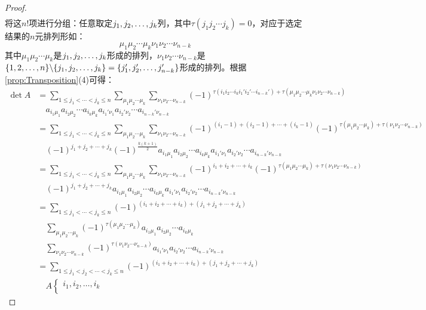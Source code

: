 \begin{proof}
\begin{align*}
	\end{align*}
	将这$n!$项进行分组：任意取定$j_1, j_2, \dots, j_{k}$列，其中$\tau(j_1j_2\cdots j_k)=0$，对应于选定结果的$n$元排列形如：
	\begin{equation*}
		\mu_1\mu_2\cdots\mu_k\nu_1\nu_2\cdots\nu_{n-k}
	\end{equation*}
	其中$\mu_1\mu_2\cdots\mu_k$是$j_1, j_2, \dots, j_{k}$形成的排列，$\nu_1\nu_2\cdots\nu_{n-k}$是$\{1,2,\dots,n\}\backslash\{j_1, j_2, \dots, j_{k}\}=\{j_1',j_2',\dots,j_{n-k}'\}$形成的排列。根据\cref{prop:Transposition}(4)可得：
	\begin{align*}
		\det A&=\sum_{1\leqslant j_1<\cdots<j_k\leqslant n}^{}\sum_{\mu_1\mu_2\cdots\mu_k}^{}\sum_{\nu_1\nu_2\cdots\nu_{n-k}}^{}(-1)^{\tau(i_1i_2\cdots i_ki_1'i_2'\cdots i_{n-k}')+\tau(\mu_1\mu_2\cdots\mu_k\nu_1\nu_2\cdots\nu_{n-k})} \\
		&\quad a_{i_1\mu_1}a_{i_2\mu_2}\cdots a_{i_k\mu_k}a_{i_1'\nu_1}a_{i_2'\nu_2}\cdots a_{i_{n-k}'\nu_{n-k}} \\
		&=\sum_{1\leqslant j_1<\cdots<j_k\leqslant n}^{}\sum_{\mu_1\mu_2\cdots\mu_k}^{}\sum_{\nu_1\nu_2\cdots\nu_{n-k}}^{}(-1)^{(i_1-1)+(i_2-1)+\cdots+(i_{k}-1)}(-1)^{\tau(\mu_1\mu_2\cdots\mu_k)+\tau(\nu_1\nu_2\cdots\nu_{n-k})} \\
		&\quad(-1)^{j_1+j_2+\cdots+j_k}(-1)^{\frac{k(k+1)}{2}}a_{i_1\mu_1}a_{i_2\mu_2}\cdots a_{i_k\mu_k}a_{i_1'\nu_1}a_{i_2'\nu_2}\cdots a_{i_{n-k}'\nu_{n-k}} \\
		&=\sum_{1\leqslant j_1<\cdots<j_k\leqslant n}^{}\sum_{\mu_1\mu_2\cdots\mu_k}^{}\sum_{\nu_1\nu_2\cdots\nu_{n-k}}^{}(-1)^{i_1+i_2+\cdots+i_k}(-1)^{\tau(\mu_1\mu_2\cdots\mu_k)+\tau(\nu_1\nu_2\cdots\nu_{n-k})} \\
		&\quad(-1)^{j_1+j_2+\cdots+j_k}a_{i_1\mu_1}a_{i_2\mu_2}\cdots a_{i_k\mu_k}a_{i_1'\nu_1}a_{i_2'\nu_2}\cdots a_{i_{n-k}'\nu_{n-k}} \\
		&=\sum_{1\leqslant j_1<\cdots<j_k\leqslant n}^{}(-1)^{(i_1+i_2+\cdots+i_k)+(j_1+j_2+\cdots+j_k)} \\
		&\quad\sum_{\mu_1\mu_2\cdots\mu_k}^{}(-1)^{\tau(\mu_1\mu_2\cdots\mu_k)}a_{i_1\mu_1}a_{i_2\mu_2}\cdots a_{i_k\mu_k} \\
		&\quad\sum_{\nu_1\nu_2\cdots\nu_{n-k}}^{}(-1)^{\tau(\nu_1\nu_2\cdots\nu_{n-k})}a_{i_1'\nu_1}a_{i_2'\nu_2}\cdots a_{i_{n-k}'\nu_{n-k}} \\
		&=\sum_{1\leqslant j_1<j_2<\cdots<j_k\leqslant n}(-1)^{(i_1+i_2+\cdots+i_k)+(j_1+j_2+\cdots+j_k)} \\
		&\quad A\left\{ \begin{array}{l}
			i_1,i_2,\dots,i_k \\

\end{array}
\end{align*}
\end{proof}
